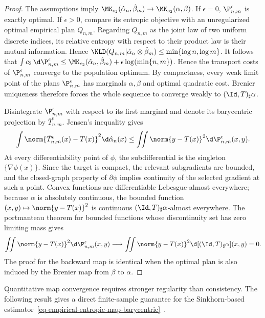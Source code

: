\begin{proof}
	The assumptions imply \(\MK_{c_2}(\hat\alpha_n,\hat\beta_m)\to\MK_{c_2}(\alpha,\beta)\). If \(\epsilon=0\), \(\P_{n,m}^{\epsilon}\) is exactly optimal. If \(\epsilon>0\), compare its entropic objective with an unregularized optimal empirical plan \(Q_{n,m}\). Regarding \(Q_{n,m}\) as the joint law of two uniform discrete indices, its relative entropy with respect to their product law is their mutual information. Hence
	$\KLD(Q_{n,m}|\hat\alpha_n\otimes\hat\beta_m) \leq \min\{\log n,\log m\}$.
	It follows that
	$\int c_2\,\d \P_{n,m}^{\epsilon} \leq \MK_{c_2}(\hat\alpha_n,\hat\beta_m) +\epsilon\log(\min\{n,m\})$.
	Hence the transport costs of \(\P_{n,m}^{\epsilon}\) converge to the population optimum. By compactness, every weak limit point of the plans \(\P_{n,m}^{\epsilon}\) has marginals \(\alpha,\beta\) and optimal quadratic cost. Brenier uniqueness therefore forces the whole sequence to converge weakly to \((\Id,T)_\sharp\alpha\).

	Disintegrate \(\P_{n,m}^{\epsilon}\) with respect to its first marginal and denote its barycentric projection by \(\bar T_{n,m}^{\epsilon}\). Jensen's inequality gives
	\[
		\int \norm{\bar T_{n,m}^{\epsilon}(x)-T(x)}^2\d\hat\alpha_n(x)
		\leq
		\iint \norm{y-T(x)}^2\d \P_{n,m}^{\epsilon}(x,y).
	\]
	At every differentiability point of \(\phi\), the subdifferential is the singleton \(\{\nabla\phi(x)\}\). Since the target is compact, the relevant subgradients are bounded, and the closed-graph property of \(\partial\phi\) implies continuity of the selected gradient at such a point. Convex functions are differentiable Lebesgue-almost everywhere; because \(\alpha\) is absolutely continuous, the bounded function \((x,y)\mapsto\norm{y-T(x)}^2\) is continuous \((\Id,T)_\sharp\alpha\)-almost everywhere. The portmanteau theorem for bounded functions whose discontinuity set has zero limiting mass gives
	\[
		\iint \norm{y-T(x)}^2\d \P_{n,m}^{\epsilon}(x,y)
		\longrightarrow
		\iint \norm{y-T(x)}^2\d[(\Id,T)_\sharp\alpha](x,y)=0.
	\]
	The proof for the backward map is identical when the optimal plan is also induced by the Brenier map from \(\beta\) to \(\alpha\).
\end{proof}

Quantitative map convergence requires stronger regularity than consistency. The following result gives a direct finite-sample guarantee for the Sinkhorn-based estimator~\eqref{eq-empirical-entropic-map-barycentric}~\cite{pooladian2021entropicOTMaps}.

